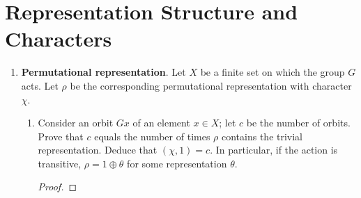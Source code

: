 \documentclass[../psets.tex]{subfiles}
\begin{document}
\section{Representation Structure and Characters}
\begin{enumerate}
    \item {}\textbf{Permutational representation}. Let $X$ be a finite set on which the group $G$ acts. Let $\rho$ be the corresponding permutational representation with character $\chi$.
    \begin{enumerate}
        \item Consider an orbit $Gx$ of an element $x\in X$; let $c$ be the number of orbits. Prove that $c$ equals the number of times $\rho$ contains the trivial representation. Deduce that $(\chi,1)=c$. In particular, if the action is transitive, $\rho=1\oplus\theta$ for some representation $\theta$.
        \begin{proof}




\end{proof}
\end{enumerate}
\end{enumerate}
\end{document}
